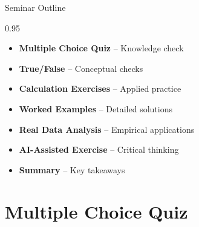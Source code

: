 \documentclass[9pt, aspectratio=169, t]{beamer}
\subtitle{Seminar 6: VAR and Granger Causality}
\begin{document}
{
\begin{frame}
    \titlepage
\end{frame}
}


\begin{frame}{Seminar Outline}
    \begin{cminipage}{0.95\textwidth}
    \begin{itemize}
        \item \textbf{Multiple Choice Quiz} -- Knowledge check
        \vspace{0.15cm}
        \item \textbf{True/False} -- Conceptual checks
        \vspace{0.15cm}
        \item \textbf{Calculation Exercises} -- Applied practice
        \vspace{0.15cm}
        \item \textbf{Worked Examples} -- Detailed solutions
        \vspace{0.15cm}
        \item \textbf{Real Data Analysis} -- Empirical applications
        \vspace{0.15cm}
        \item \textbf{AI-Assisted Exercise} -- Critical thinking
        \vspace{0.15cm}
        \item \textbf{Summary} -- Key takeaways
    \end{itemize}
    \end{cminipage}
\end{frame}

\section{Multiple Choice Quiz}
\end{document}
